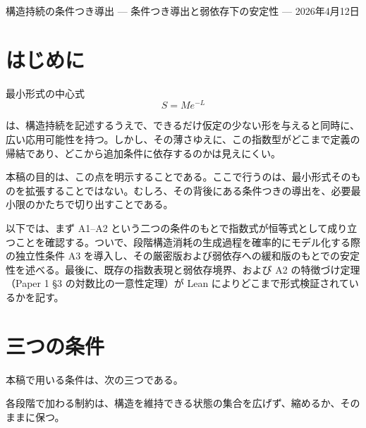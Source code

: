 \documentclass[12pt,a4paper]{article}
\begin{document}
\PaperTitleBlock
  {構造持続の条件つき導出}
  {— 条件つき導出と弱依存下の安定性 —}
  {2026年4月12日}

\begin{abstract}
前稿で示した構造持続の最小形式 \(S = Me^{-L}\) の背後には、状態集合の残存量に関する指数式 \(m(V^{(n)}) = m(V^{(0)}) e^{-L}\) がある。この式は、状態集合の縮小率を対数比で定義する限り恒等式として成り立ち、構造消耗どうしの独立性を要しない。本稿の目的は、この恒等式を繰り返すことではなく、どこまでが定義の帰結であり、どこからが追加条件に依存するのかを明示することにある。

そのために、まず A1--A2 のもとで恒等式が成り立つことを確認する。ついで、段階構造消耗の生成過程を確率的にモデル化する際の独立性条件 A3 を導入し、その緩和のもとでどこまで安定性が保たれるかを述べる。最後に、Lean による形式検証の範囲を記す。本稿の役割は、最小形式の背後にある数学的骨格を、必要最小限のかたちで与えることにある。
\end{abstract}

\section{はじめに}\label{ux306fux3058ux3081ux306b}

最小形式の中心式 \[
S = Me^{-L}
\]

は、構造持続を記述するうえで、できるだけ仮定の少ない形を与えると同時に、広い応用可能性を持つ。しかし、その薄さゆえに、この指数型がどこまで定義の帰結であり、どこから追加条件に依存するのかは見えにくい。

本稿の目的は、この点を明示することである。ここで行うのは、最小形式そのものを拡張することではない。むしろ、その背後にある条件つきの導出を、必要最小限のかたちで切り出すことである。

以下では、まず A1--A2 という二つの条件のもとで指数式が恒等式として成り立つことを確認する。ついで、段階構造消耗の生成過程を確率的にモデル化する際の独立性条件 A3 を導入し、その厳密版および弱依存への緩和版のもとでの安定性を述べる。最後に、既存の指数表現と弱依存境界、および A2 の特徴づけ定理（Paper 1 §3 の対数比の一意性定理）が Lean によりどこまで形式検証されているかを記す。

\section{三つの条件}\label{ux4e09ux3064ux306eux6761ux4ef6}

本稿で用いる条件は、次の三つである。

\begin{assumption}[A1]
各段階で加わる制約は、構造を維持できる状態の集合を広げず、縮めるか、そのままに保つ。
\end{assumption}
\end{document}
